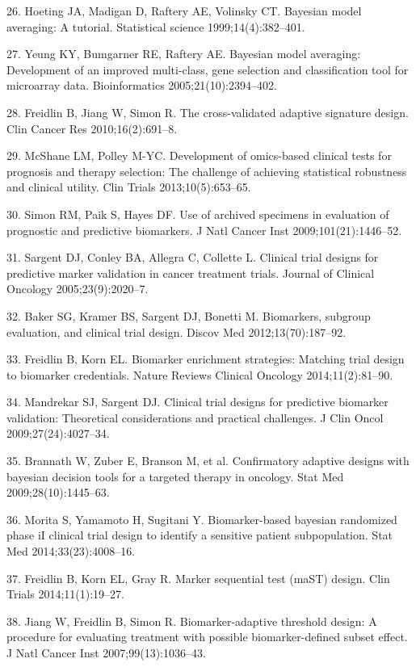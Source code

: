 \documentclass[11pt]{article}
\begin{document}
26. Hoeting JA, Madigan D, Raftery AE, Volinsky CT. Bayesian model
averaging: A tutorial. Statistical science 1999;14(4):382--401.

27. Yeung KY, Bumgarner RE, Raftery AE. Bayesian model averaging:
Development of an improved multi-class, gene selection and
classification tool for microarray data. Bioinformatics
2005;21(10):2394--402.

28. Freidlin B, Jiang W, Simon R. The cross-validated adaptive signature
design. Clin Cancer Res 2010;16(2):691--8.

29. McShane LM, Polley M-YC. Development of omics-based clinical tests
for prognosis and therapy selection: The challenge of achieving
statistical robustness and clinical utility. Clin Trials
2013;10(5):653--65.

30. Simon RM, Paik S, Hayes DF. Use of archived specimens in evaluation
of prognostic and predictive biomarkers. J Natl Cancer Inst
2009;101(21):1446--52.

31. Sargent DJ, Conley BA, Allegra C, Collette L. Clinical trial designs
for predictive marker validation in cancer treatment trials. Journal of
Clinical Oncology 2005;23(9):2020--7.

32. Baker SG, Kramer BS, Sargent DJ, Bonetti M. Biomarkers, subgroup
evaluation, and clinical trial design. Discov Med 2012;13(70):187--92.

33. Freidlin B, Korn EL. Biomarker enrichment strategies: Matching trial
design to biomarker credentials. Nature Reviews Clinical Oncology
2014;11(2):81--90.

34. Mandrekar SJ, Sargent DJ. Clinical trial designs for predictive
biomarker validation: Theoretical considerations and practical
challenges. J Clin Oncol 2009;27(24):4027--34.

35. Brannath W, Zuber E, Branson M, et al. Confirmatory adaptive designs
with bayesian decision tools for a targeted therapy in oncology. Stat
Med 2009;28(10):1445--63.

36. Morita S, Yamamoto H, Sugitani Y. Biomarker-based bayesian
randomized phase iI clinical trial design to identify a sensitive
patient subpopulation. Stat Med 2014;33(23):4008--16.

37. Freidlin B, Korn EL, Gray R. Marker sequential test (maST) design.
Clin Trials 2014;11(1):19--27.

38. Jiang W, Freidlin B, Simon R. Biomarker-adaptive threshold design: A
procedure for evaluating treatment with possible biomarker-defined
subset effect. J Natl Cancer Inst 2007;99(13):1036--43.
\end{document}
